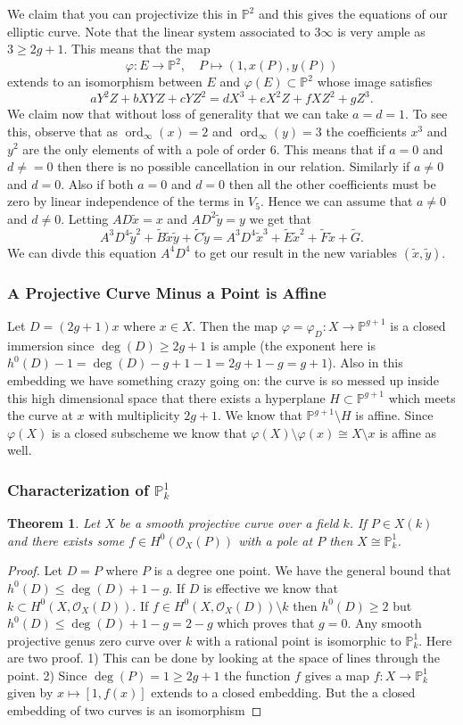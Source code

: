 \documentclass[12pt]{article}
\numberwithin{equation}{section}
\newtheorem{theorem}{Theorem}[subsection]
\theoremstyle{definition}
\theoremstyle{remark}
\newcommand{\Ocal}{\mathcal{O}}
\newcommand{\PP}{\mathbb{P}}
\newcommand{\ord}{\operatorname{ord}}
\newcommand{\xtilde}{\widetilde{x}}
\newcommand{\ytilde}{\widetilde{y}}
\newcommand{\Btilde}{\widetilde{B}}
\newcommand{\Ctilde}{\widetilde{C}}
\newcommand{\Etilde}{\widetilde{E}}
\newcommand{\Ftilde}{\widetilde{F}}
\newcommand{\Gtilde}{\widetilde{G}}
\begin{document}
We claim that you can projectivize this in $\PP^2$ and this gives the equations of our elliptic curve.
Note that the linear system associated to $3\infty$ is very ample as $3\geq 2g+1$.
This means that the map 
$$ \varphi: E \to \PP^2, \quad P\mapsto (1,x(P),y(P)) $$
extends to an isomorphism between $E$ and $\varphi(E) \subset \PP^2$ whose image satisfies
 $$ aY^2Z+bXYZ+cYZ^2=dX^3+eX^2Z+fXZ^2+gZ^3.$$
We claim now that without loss of generality that we can take $a=d=1$.
To see this, observe that as $\ord_{\infty}(x)=2$ and $\ord_{\infty}(y)=3$ the coefficients $x^3$ and $y^2$ are the only elements of with a pole of order $6$. 
This means that if $a=0$ and $d\neq =0$ then there is no possible cancellation in our relation. 
Similarly if $a\neq0$ and $d=0$. 
Also if both $a=0$ and $d=0$ then all the other coefficients must be zero by linear independence of the terms in $V_5$.
Hence we can assume that $a\neq 0$ and $d\neq 0$.
Letting $AD\xtilde =x$ and $AD^2 \ytilde = y$ we get that 
  $$A^3D^4 \ytilde^2+\Btilde \xtilde \ytilde +\Ctilde \ytilde= A^3D^4 \xtilde^3+\Etilde \xtilde^2 + \Ftilde \xtilde + \Gtilde.$$
We can divde this equation $A^4D^4$ to get our result in the new variables $(\xtilde,\ytilde)$.
\subsubsection{A Projective Curve Minus a Point is Affine}
Let $D=(2g+1)x$ where $x \in X$.
Then the map $\varphi=\varphi_D:X \to \PP^{g+1}$ is a closed immersion since $\deg(D)\geq 2g+1$ is ample (the exponent here is $h^0(D)-1=\deg(D)-g+1-1=2g+1-g=g+1$).
Also in this embedding we have something crazy going on: the curve is so messed up inside this high dimensional space that there exists a hyperplane $H\subset \PP^{g+1}$ which meets the curve at $x$ with multiplicity $2g+1$.
We know that $\PP^{g+1}\setminus H$ is affine. 
Since $\varphi(X)$ is a closed subscheme we know that $\varphi(X)\setminus \varphi(x) \cong X\setminus x$ is affine as well.

\subsubsection{Characterization of $\PP^1_k$}
\begin{theorem}
	Let $X$ be a smooth projective curve over a field $k$. 
	If $P\in X(k)$ and there exists some $f\in H^0(\Ocal_{X}(P))$ with a pole at $P$ then $X\cong \PP^1_k$. 
\end{theorem}
\begin{proof}
	Let $D = P$ where $P$ is a degree one point. 
	We have the general bound that $h^0(D) \leq \deg(D) + 1-g$.
	If $D$ is effective we know that $k \subset H^0(X,\Ocal_X(D))$. 
	If $f \in H^0(X,\Ocal_X(D))\setminus k$ then $h^0(D)\geq 2$ but $h^0(D)\leq \deg(D)+1-g = 2-g$ which proves that $g=0$. 
	Any smooth projective genus zero curve over $k$ with a rational point is isomorphic to $\PP^1_k$.
	Here are two proof.
	1) This can be done by looking at the space of lines through the point.
	2)  Since $\deg(P)=1\geq 2g+1$ the function $f$ gives a map $f:X\to\PP^1_k$ given by $x\mapsto [1,f(x)]$ extends to a closed embedding. But the a closed embedding of two curves is an isomorphism
\end{proof}
\end{document}
